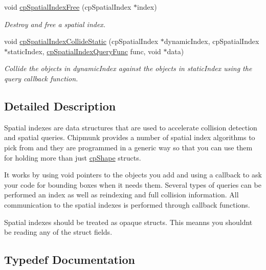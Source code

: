 \begin{DoxyCompactItemize}
\mbox{\label{group__cp_spatial_index_ga13a62ecd13b6dbee7d4c8ae056e0f86f}} 
void \mbox{\hyperlink{group__cp_spatial_index_ga13a62ecd13b6dbee7d4c8ae056e0f86f}{cp\+Spatial\+Index\+Free}} (cp\+Spatial\+Index $\ast$index)
\begin{DoxyCompactList}\small\item\em Destroy and free a spatial index. \end{DoxyCompactList}\item 
\mbox{\label{group__cp_spatial_index_ga8abb667968f231b2f87c7273d4b0e533}} 
void \mbox{\hyperlink{group__cp_spatial_index_ga8abb667968f231b2f87c7273d4b0e533}{cp\+Spatial\+Index\+Collide\+Static}} (cp\+Spatial\+Index $\ast$dynamic\+Index, cp\+Spatial\+Index $\ast$static\+Index, \mbox{\hyperlink{group__cp_spatial_index_ga7bcf80d017b29d32d9f8011405b241f9}{cp\+Spatial\+Index\+Query\+Func}} func, void $\ast$data)
\begin{DoxyCompactList}\small\item\em Collide the objects in {\ttfamily dynamic\+Index} against the objects in {\ttfamily static\+Index} using the query callback function. \end{DoxyCompactList}\end{DoxyCompactItemize}


\subsection{Detailed Description}
Spatial indexes are data structures that are used to accelerate collision detection and spatial queries. Chipmunk provides a number of spatial index algorithms to pick from and they are programmed in a generic way so that you can use them for holding more than just \mbox{\hyperlink{structcp_shape}{cp\+Shape}} structs.

It works by using {\ttfamily void} pointers to the objects you add and using a callback to ask your code for bounding boxes when it needs them. Several types of queries can be performed an index as well as reindexing and full collision information. All communication to the spatial indexes is performed through callback functions.

Spatial indexes should be treated as opaque structs. This meanns you shouldn\textquotesingle{}t be reading any of the struct fields. 

\subsection{Typedef Documentation}
\mbox{\label{group__cp_spatial_index_ga5e805ddbe3cab9b92a6fbd933ff6e6b0}} 
